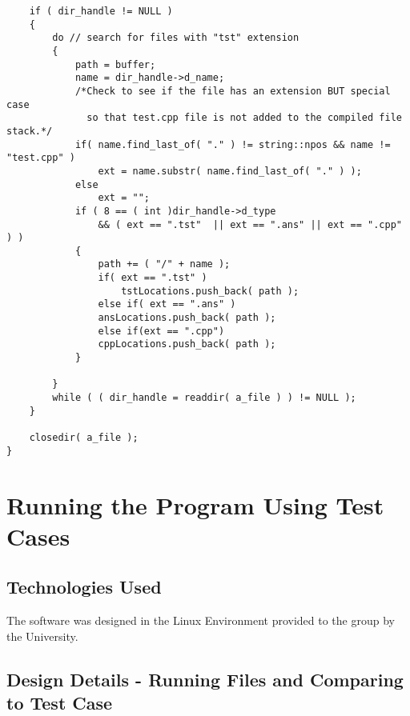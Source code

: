 \begin{lstlisting}
    if ( dir_handle != NULL )
    {
        do // search for files with "tst" extension
        {
            path = buffer;
            name = dir_handle->d_name;
            /*Check to see if the file has an extension BUT special case
              so that test.cpp file is not added to the compiled file stack.*/
            if( name.find_last_of( "." ) != string::npos && name != "test.cpp" )
                ext = name.substr( name.find_last_of( "." ) );
            else 
                ext = "";
            if ( 8 == ( int )dir_handle->d_type 
                && ( ext == ".tst"  || ext == ".ans" || ext == ".cpp" ) )
            {
                path += ( "/" + name );
                if( ext == ".tst" )
	                tstLocations.push_back( path );
                else if( ext == ".ans" )
		        ansLocations.push_back( path );
                else if(ext == ".cpp")
		        cppLocations.push_back( path );
            }

        }
        while ( ( dir_handle = readdir( a_file ) ) != NULL );
    }

    closedir( a_file );
}
\end{lstlisting}

\section{Running the Program Using Test Cases }

\subsection{Technologies  Used}
The software was designed in the Linux Environment provided to the group by the University.



\subsection{Design Details - Running Files and Comparing to Test Case}


